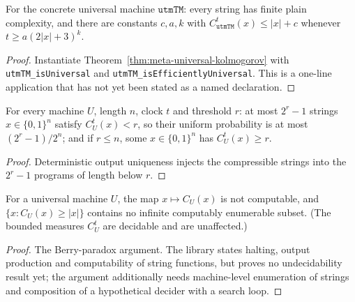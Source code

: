 \begin{corollary}
  \label{cor:meta-utm-kolmogorov}
  For the concrete universal machine $\mathtt{utmTM}$: every string has finite
  plain complexity, and there are constants $c, a, k$ with
  $C^t_{\mathtt{utmTM}}(x) \le |x| + c$ whenever $t \ge a(2|x|+3)^k$.
\end{corollary}
\begin{proof}
  Instantiate Theorem~\ref{thm:meta-universal-kolmogorov} with
  \texttt{utmTM\_isUniversal} and \texttt{utmTM\_isEfficientlyUniversal}. This
  is a one-line application that has not yet been stated as a named
  declaration.
\end{proof}

\begin{theorem}
  \label{thm:meta-incompressibility}
  \leanok
  For every machine $U$, length $n$, clock $t$ and threshold $r$: at most
  $2^r - 1$ strings $x \in \{0,1\}^n$ satisfy $C^t_U(x) < r$, so their
  uniform probability is at most $(2^r - 1)/2^n$; and if $r \le n$, some
  $x \in \{0,1\}^n$ has $C^t_U(x) \ge r$.
\end{theorem}
\begin{proof}
  \leanok
  Deterministic output uniqueness injects the compressible strings into the
  $2^r - 1$ programs of length below $r$.
\end{proof}

\begin{theorem}
  \label{thm:meta-kolmogorov-noncomputable}
  \notready
  For a universal machine $U$, the map $x \mapsto C_U(x)$ is not computable,
  and $\{x : C_U(x) \ge |x|\}$ contains no infinite computably enumerable
  subset. (The bounded measures $C^t_U$ are decidable and are unaffected.)
\end{theorem}
\begin{proof}
  The Berry-paradox argument. The library states halting, output production
  and computability of string functions, but proves no undecidability result
  yet; the argument additionally needs machine-level enumeration of strings
  and composition of a hypothetical decider with a search loop.
\end{proof}

